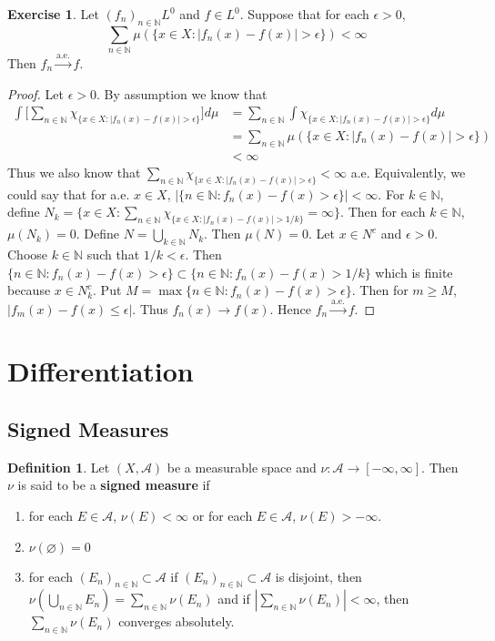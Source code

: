 \documentclass[12pt]{amsart}
\theoremstyle{definition}
\newtheorem{defn}[definition]{Definition}
\newtheorem{ex}[definition]{Exercise}
\newcommand{\ep}{\epsilon}
\newcommand{\N}{\mathbb{N}}
\newcommand{\MA}{\mathcal{A}}
\newcommand{\convt}[1]{\xrightarrow{\text{#1}}}
\newcommand{\lex}[1]{\label{ex:#1}}
\newcommand{\ld}[1]{\label{defn:#1}}
\begin{document}
	
	\begin{ex} \lex{35015} 
		Let $(f_n)_{n \in \N} L^0$ and $f \in L^0$. Suppose that for each $\ep >0$, $$\sum_{n \in \N}\mu(\{x \in X: |f_n(x)-f(x)| > \ep\}) < \infty$$
		Then $f_n \convt{a.e.} f$.
	\end{ex}
	
	\begin{proof}
		Let $\ep>0$. By assumption we know that
		\begin{align*}
			\int \bigg[ \sum_{n \in \N}\chi_{\{x \in X: |f_n(x)-f(x)| > \ep\}}\bigg] d \mu 
			&= \sum_{n \in \N}\int \chi_{\{x \in X: |f_n(x)-f(x)| > \ep\}}d \mu\\
			&=\sum_{n \in \N}\mu(\{x \in X: |f_n(x)-f(x)| > \ep\})\\
			& < \infty
		\end{align*}
		Thus we also know that $\sum_{n \in \N}\chi_{\{x \in X: |f_n(x)-f(x)| > \ep\}} < \infty$ a.e. Equivalently, we could say that for a.e. $x \in X$, $|\{n \in \N: f_n(x) - f(x) > \ep\}| < \infty$. For $k \in \N$, define $N_k = \{x \in X: \sum_{n \in \N}\chi_{\{x \in X: |f_n(x)-f(x)| > 1/k\}} = \infty\}$. Then for each $k \in \N$, $\mu(N_k) = 0$. Define $N = \bigcup_{k \in \N} N_k$. Then $\mu(N) = 0$. Let $x \in N^c$ and $\ep > 0$. Choose $k \in \N$ such that $1/k < \ep$. Then $\{n \in \N: f_n(x) - f(x) > \ep\} \subset \{n \in \N: f_n(x) - f(x) > 1/k\}$ which is finite because $x \in N_k^c$. Put $M = \max\{n \in \N: f_n(x) - f(x) > \ep\}$. Then for $m \geq M$, $|f_m(x) - f(x) \leq \ep|$. Thus $f_n(x) \rightarrow f(x)$. Hence $f_n \convt{a.e.} f$.
	\end{proof}
	
	
	
	
	
	
	
	
	
	
	
	
	
	\newpage
	\section{Differentiation}
	
	\subsection{Signed Measures}
	
	\begin{defn} \ld{00000} 
		Let $(X, \MA)$ be a measurable space and $\nu : \MA \rightarrow [-\infty, \infty]$. Then $\nu$ is said to be a \textbf{signed measure} if 
		\begin{enumerate}
			\item for each $E \in \MA$, $\nu(E) < \infty$ or for each $E \in \MA$, $\nu(E) > -\infty$.
			\item $\nu(\varnothing) = 0$
			\item for each $(E_n)_{n \in \N} \subset \MA$ if $(E_n)_{n \in \N} \subset \MA$ is disjoint, then $\nu(\bigcup\limits_{n \in \N} E_n) = \sum\limits_{n \in \N} \nu(E_n)$ and if $|\sum\limits_{n \in \N} \nu(E_n)| < \infty$, then $\sum\limits_{n \in \N} \nu(E_n)$ converges absolutely.
		\end{enumerate}
	\end{defn}
	
\end{document}
